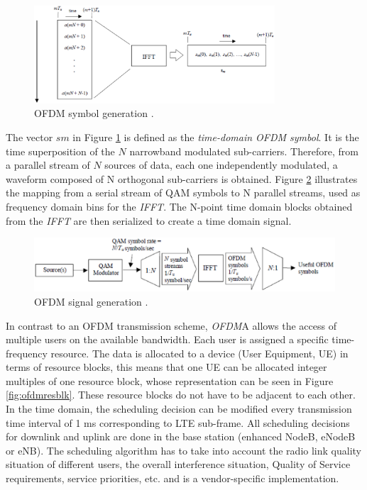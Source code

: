 \begin{figure}[htbp]
    \centering
    \includegraphics[width=0.8\textwidth]{./figures/ofdm_symbol_gen}
    \caption{ OFDM symbol generation \cite{umtslte}.
    \label{fig:ofdmsymbol}}
\end{figure}

The vector $sm$ in Figure \ref{fig:ofdmsymbol} is defined as the
\emph{time-domain OFDM symbol}. It is the time superposition of the $N$
narrowband modulated sub-carriers. Therefore, from a parallel stream of $N$
sources of data, each one independently modulated, a waveform composed of N
orthogonal sub-carriers is obtained. Figure \ref{fig:ofdmchain} illustrates the
mapping from a serial stream of QAM symbols to N parallel streams, used as
frequency domain bins for the \textit{IFFT}. The N-point time domain blocks
obtained from the \textit{IFFT} are then serialized to create a time domain
signal.

\begin{figure}[htbp]
    \centering
    \includegraphics[width=1.1\textwidth]{./figures/ofdm_signal_chain}
    \caption{ OFDM signal generation \cite{umtslte}.
    \label{fig:ofdmchain}}
\end{figure}

In contrast to an OFDM transmission scheme, \textit{OFDM}A allows the access of
multiple users on the available bandwidth. Each user is assigned a specific
time-frequency resource. The data is allocated to a device (User Equipment, UE)
in terms of resource blocks, this means that one UE can be allocated integer
multiples of one resource block, whose representation can be seen in Figure
\ref{fig:ofdmresblk}. These resource blocks do not have to be adjacent to each
other. In the time domain, the scheduling decision can be modified every
transmission time interval of 1 ms corresponding to LTE sub-frame. All scheduling
decisions for downlink and uplink are done in the base station (enhanced NodeB,
eNodeB or eNB). The scheduling algorithm has to take into account the radio link
quality situation of different users, the overall interference situation,
Quality of Service requirements, service priorities, etc. and is a
vendor-specific implementation.

